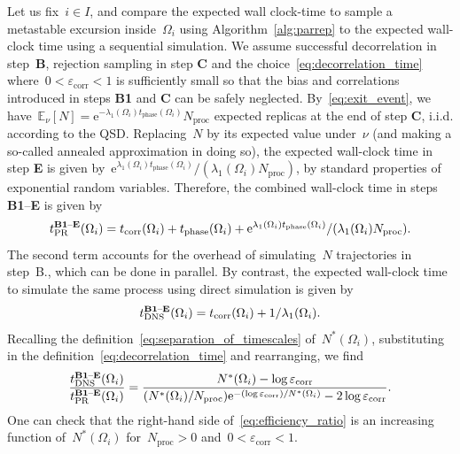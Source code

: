 \documentclass[a4]{article}
\newcommand{\e}{\mathrm{e}}
\newcommand{\E}{\mathbb{E}}
\newcommand{\1}{\mathbbm 1}
\newcommand{\corr}{\mathrm{corr}}
\newcommand{\phase}{\mathrm{phase}}
\begin{document}
    Let us fix~$i\in I$, and compare the expected wall clock-time to sample a metastable excursion inside~$\Omega_i$ using Algorithm~\ref{alg:parrep} to the expected wall-clock time using a sequential simulation.
    We assume successful decorrelation in step~{\bf B}, rejection sampling in step {\bf C} and the choice~\eqref{eq:decorrelation_time} where~$0<\varepsilon_{\corr}<1$ is sufficiently small so that the bias and correlations introduced in steps {\bf B1} and {\bf C} can be safely neglected.
    By~\eqref{eq:exit_event}, we have~$\E_\nu[N] = \e^{-\lambda_1(\Omega_i) t_{\phase}(\Omega_i)}N_{\mathrm{proc}}$ expected replicas at the end of step {\bf C}, i.i.d. according to the QSD.
    Replacing~$N$ by its expected value under~$\nu$ (and making a so-called annealed approximation in doing so), the expected wall-clock time in step {\bf E} is given by~$\e^{\lambda_1(\Omega_i)t_{\phase}(\Omega_i)}/(\lambda_1(\Omega_i)N_{\mathrm{proc}})$, by standard properties of exponential random variables. Therefore, the combined wall-clock time in steps {\bf B1}--{\bf E} is given by
    \begin{equation}
        \label{eq:wall_clock_time}
        t_{\mathrm{PR}}^{\text{{\bf B1}--{\bf E}}}(\Omega_i) = t_{\corr}(\Omega_i) + t_{\phase}(\Omega_i) + \e^{\lambda_1(\Omega_i)t_{\phase}(\Omega_i)}/(\lambda_1(\Omega_i)N_{\mathrm{proc}}).
    \end{equation}
    The second term accounts for the overhead of simulating~$N$ trajectories in step~B., which can be done in parallel.
    By contrast, the expected wall-clock time to simulate the same process using direct simulation is given by
    \begin{equation}
        \label{eq:wall_clock_time_direct}
        t_{\mathrm{DNS}}^{\text{{\bf B1}--{\bf E}}}(\Omega_i) = t_{\corr}(\Omega_i) + 1/\lambda_1(\Omega_i).
    \end{equation}
    Recalling the definition~\eqref{eq:separation_of_timescales} of~$N^*(\Omega_i)$, substituting in the definition~\eqref{eq:decorrelation_time} and rearranging, we find
    \begin{equation}
        \label{eq:efficiency_ratio}
        \frac{t_{\mathrm{DNS}}^{\text{{\bf B1}--{\bf E}}}(\Omega_i)}{t_{\mathrm{PR}}^{\text{{\bf B1}--{\bf E}}}(\Omega_i)} = \frac{N^*(\Omega_i)-\log\varepsilon_{\corr}}{(N^*(\Omega_i)/N_{\mathrm{proc}})\e^{-(\log\varepsilon_{\corr})/N^*(\Omega_i)}-2\log\varepsilon_\corr}.
    \end{equation}
    One can check that the right-hand side of~\eqref{eq:efficiency_ratio} is an increasing function of~$N^*(\Omega_i)$ for~$N_{\mathrm{proc}}>0$ and~$0<\varepsilon_{\corr}<1$.
\end{document}
